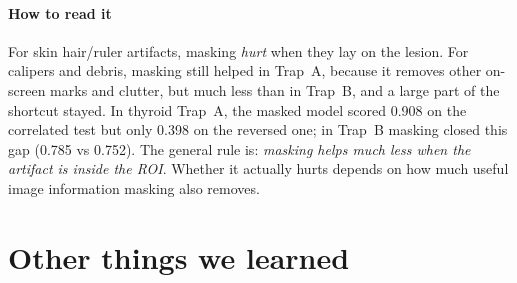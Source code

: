 \documentclass[11pt,a4paper]{article}
\begin{document}
\paragraph{How to read it} For skin hair/ruler artifacts, masking \emph{hurt} when they lay on the lesion. For calipers and debris,
masking still helped in Trap~A, because it removes other on-screen marks and clutter, but much less than in Trap~B, and
a large part of the shortcut stayed. In thyroid Trap~A, the masked model scored 0.908 on the correlated test but only
0.398 on the reversed one; in Trap~B masking closed this gap (0.785 vs 0.752). The general rule is: \emph{masking helps
much less when the artifact is inside the ROI}. Whether it actually hurts depends on how much useful image information
masking also removes.

\section{Other things we learned}\label{sec:other}
\end{document}
